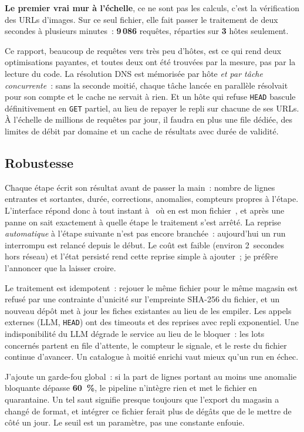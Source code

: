 \documentclass[11pt,a4paper]{article}
\newcommand{\pa}{\textcolor{amber}{\small\ding{108}}}
\newcommand{\code}[1]{\texttt{\small #1}}
\newcommand{\gui}[1]{\guillemotleft{}~#1~\guillemotright{}}
\begin{document}
\begin{notebox}
\textbf{Le premier vrai mur à l'échelle}, ce ne sont pas les calculs, c'est la vérification des
URLs d'images. Sur ce seul fichier, elle fait passer le traitement de deux secondes à plusieurs
minutes~: \textbf{9\,086} requêtes, réparties sur \textbf{3} hôtes seulement.

Ce rapport, beaucoup de requêtes vers très peu d'hôtes, est ce qui rend deux optimisations
payantes, et toutes deux ont été trouvées par la mesure, pas par la lecture du code. La résolution
DNS est mémorisée par hôte \emph{et par tâche concurrente}~: sans la seconde moitié, chaque tâche
lancée en parallèle résolvait pour son compte et le cache ne servait à rien. Et un hôte qui refuse
\code{HEAD} bascule définitivement en \code{GET} partiel, au lieu de repayer le repli sur chacune
de ses URLs. À l'échelle de
millions de requêtes par jour, il faudra en plus une file dédiée, des limites de débit par domaine
et un cache de résultats avec durée de validité.
\end{notebox}

\subsection{Robustesse}
Chaque étape écrit son résultat avant de passer la main~: nombre de lignes entrantes et sortantes,
durée, corrections, anomalies, compteurs propres à l'étape. L'interface répond donc à tout instant
à \gui{où en est mon fichier}, et après une panne on sait exactement à quelle étape le traitement
s'est arrêté. \pa{} La reprise \emph{automatique} à l'étape suivante n'est pas encore branchée~:
aujourd'hui un run interrompu est relancé depuis le début. Le coût est faible (environ 2~secondes hors
réseau) et l'état persisté rend cette reprise simple à ajouter~; je préfère l'annoncer que la
laisser croire.

Le traitement est idempotent~: rejouer le même fichier pour le même magasin est refusé par une
contrainte d'unicité sur l'empreinte SHA-256 du fichier, et un nouveau dépôt met à jour les fiches
existantes au lieu de les empiler. Les appels externes (LLM, \code{HEAD}) ont des timeouts et des
reprises avec repli exponentiel. Une indisponibilité du LLM dégrade le service au lieu de le
bloquer~: les lots concernés partent en file d'attente, le compteur le signale, et le reste du
fichier continue d'avancer. Un catalogue à moitié enrichi vaut mieux qu'un run en échec.

J'ajoute un garde-fou global~: si la part de lignes portant au moins une anomalie bloquante dépasse
\textbf{60~\%}, le pipeline n'intègre rien et met le fichier en quarantaine. Un tel saut signifie
presque toujours que l'export du magasin a changé de format, et intégrer ce fichier ferait plus de
dégâts que de le mettre de côté un jour. Le seuil est un paramètre, pas une constante enfouie.
\end{document}
